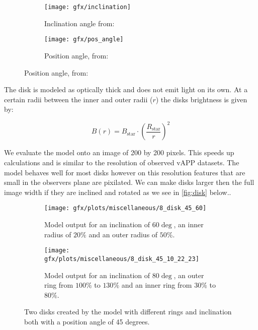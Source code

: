 \begin{figure}[h!]
  \centering
  \begin{subfigure}[b]{0.4\textwidth}
    \texttt{[image: gfx/inclination]}
    \caption{Inclination angle from: \cite{Pieter_Okko}}
    \label{fig:pos_angle}

  \end{subfigure}
  \begin{subfigure}[b]{0.4\textwidth}
    \texttt{[image: gfx/pos\_angle]}
    \caption{Position angle, from: \cite{Pieter_Okko}}
    \label{fig:inclination}
  \end{subfigure}
  \label{fig:1}
\end{figure}

The disk is modeled as optically thick and does not emit light on its own. At a certain radii between the inner and outer radii ($r$) the disks brightness is given by:

\begin{equation}
B(r) = B_{\text{star}} \cdot {\left(\frac{R_{\text{star}}}{r}\right)}^2
\end{equation}


We evaluate the model onto an image of 200 by 200 pixels. This speeds up calculations and is similar to the resolution of observed \ac{vAPP} datasets. The model behaves well for most disks however on this resolution features that are small in the observers plane are pixilated. We can make disks larger then the full image width if they are inclined and rotated as we see in \autoref{fig:disk} below..

\begin{figure}[h!]
  \begin{subfigure}[t]{0.5\textwidth}
    \texttt{[image: gfx/plots/miscellaneous/8\_disk\_45\_60]}
    \caption{Model output for an inclination of $60\deg$, an inner radius of $20\%$ and an outer radius of $50\%$.}
  \end{subfigure}
  \begin{subfigure}[t]{0.5\textwidth}
    \texttt{[image: gfx/plots/miscellaneous/8\_disk\_45\_10\_22\_23]}
    \caption{Model output for an inclination of $80\deg$, an outer ring from $100\%$ to $130\%$ and an inner ring from $30\%$ to $80\%$.}
  \end{subfigure}
  \caption{Two disks created by the model with different rings and inclination both with a position angle of 45 degrees.}
  \label{fig:disk}
\end{figure}

